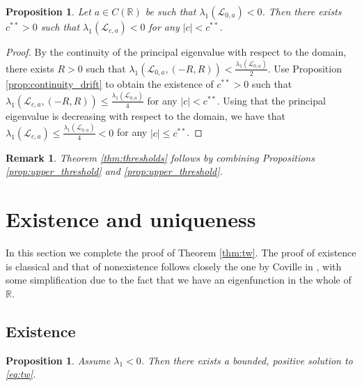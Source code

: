 \documentclass[11pt,a4paper]{amsart}
\newcommand{\Lop}{\mathcal{L}}
\newcommand{\R}{\mathbb{R}}
\newtheorem{prop}[thm]{Proposition}
\newtheorem{rmk}{Remark}
\begin{document}
\begin{prop}
\label{prop:lower_threshold}
Let $a \in C(\R)$ be such that $\lambda_1(\Lop_{0,a}) <0$. Then there exists $c^{**}>0$ such that $\lambda_1(\Lop_{c,a}) < 0 $ for any $|c| < c^{**}$. 
\end{prop}

\begin{proof}
By the continuity of the principal eigenvalue with respect to the domain, there exists $R>0$ such that $\lambda_1(\Lop_{0,a}, (-R,R)) < \frac{\lambda_1(\Lop_{0,a})}2$. Use Proposition \ref{prop:continuity_drift} to obtain the existence of $c^{**} > 0$ such that $\lambda_1(\Lop_{c,a}, (-R,R)) \leq \frac{\lambda_1(\Lop_{0,a})}{4}$ for any $|c| < c^{**}$. Using that the principal eigenvalue is decreasing with respect to the domain, we have that $\lambda_1(\Lop_{c,a}) \leq \frac{\lambda_1(\Lop_{0,a})}{4} < 0$ for any $|c|\leq c^{**}$. 
\end{proof}

\begin{rmk}
Theorem \ref{thm:thresholds} follows by combining Propositions \ref{prop:upper_threshold} and \ref{prop:upper_threshold}.
\end{rmk}
\section{Existence and uniqueness}
\label{sect:existence}

In this section we complete the proof of Theorem \ref{thm:tw}. The proof of existence is classical and that of nonexistence follows closely the one by Coville in \cite{C21}, with some simplification due to the fact that we have an eigenfunction in the whole of $\R$.

\subsection{Existence}

\begin{prop}
\label{prop:existence}
Assume $\lambda_1 < 0$. Then there exists a bounded, positive solution to \eqref{eq:tw}.
\end{prop}
\end{document}
